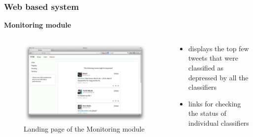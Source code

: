 \documentclass{beamer}
\begin{document}
    \begin{frame}
        \frametitle{Web based system}
        \begin{center}
            \textbf{Monitoring module}
        \end{center}
        \begin{columns}
            \begin{column}{0.5\textwidth}
                \begin{figure}
                    \centering
                    \includegraphics[width=\textwidth]{figures/monitoring_landing_1.png}
                    \caption{Landing page of the Monitoring module}
                \end{figure}
            \end{column}
            \begin{column}{0.5\textwidth}
                \begin{itemize}
                    \item{displays the top few tweets that were classified as depressed by all the classifiers}
                    \item{links for checking the status of individual classifiers}
                \end{itemize}
            \end{column}
        \end{columns}
    \end{frame}
    
\end{document}
